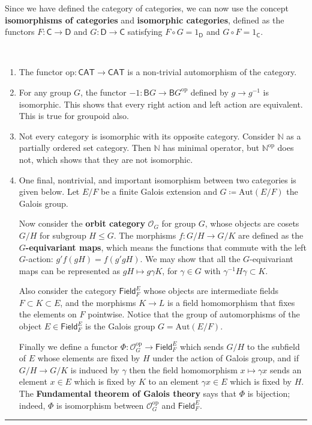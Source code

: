 Since we have defined the category of categories, we can now use the concept \textbf{isomorphisms of categories} and \textbf{isomorphic categories}, defined as the functors $F:\mathsf{C}\rightarrow \mathsf{D}$ and $G:\mathsf{D}\rightarrow \mathsf{C}$ satisfying $F\circ G=1_{\mathsf{D}}$ and $G\circ F=1_{\mathsf{C}}$.

\begin{exmp}
~\begin{enumerate}
\item The functor $\mathrm{op}:\mathsf{CAT}\rightarrow \mathsf{CAT}$ is a non-trivial automorphism of the category.
\item For any group $G$, the functor $-1:\mathsf{B}G\rightarrow \mathsf{B}G^{\mathrm{op}}$ defined by $g\rightarrow g^{-1}$ is isomorphic. This shows that every right action and left action are equivalent. This is true for groupoid also.
\item Not every category is isomorphic with its opposite category. Consider $\mathbb{N}$ as a partially ordered set category. Then $\mathbb{N}$ has minimal operator, but $\mathbb{N}^{\mathrm{op}}$ does not, which shows that they are not isomorphic.
\item One final, nontrivial, and important isomorphism between two categories is given below. Let $E/F$ be a finite Galois extension and $G\coloneqq \mathrm{Aut}(E/F)$ the Galois group. 

Now consider the \textbf{orbit category} $\mathcal{O}_G$ for group $G$, whose objects are cosets $G/H$ for subgroup $H\leq G$. The morphisms $f:G/H\rightarrow G/K$ are defined as the \textbf{$G$-equivariant maps}, which means the functions that commute with the left $G$-action: $g'f(gH)=f(g'gH)$. We may show that all the $G$-equivariant maps can be represented as $gH\mapsto g\gamma K$, for $\gamma \in G$ with $\gamma^{-1}H\gamma\subset K$.

Also consider the category $\mathsf{Field}_F^E$ whose objects are intermediate fields $F\subset K\subset E$, and the morphisms $K\rightarrow L$ is a field homomorphism that fixes the elements on $F$ pointwise. Notice that the group of automorphisms of the object $E\in \mathsf{Field}_F^E$ is the Galois group $G=\mathrm{Aut}(E/F)$.

Finally we define a functor $\Phi:\mathcal{O}_G^{\mathrm{op}}\rightarrow \mathsf{Field}_F^E$ which sends $G/H$ to the subfield of $E$ whose elements are fixed by $H$ under the action of Galois group, and if $G/H\rightarrow G/K$ is induced by $\gamma$ then the field homomorphism $x\mapsto \gamma x$ sends an element $x\in E$ which is fixed by $K$ to an element $\gamma x\in E$ which is fixed by $H$. The \textbf{Fundamental theorem of Galois theory} says that $\Phi$ is bijection; indeed, $\Phi$ is isomorphism between $\mathcal{O}_G^{\mathrm{op}}$ and $\mathsf{Field}_F^E$.
\end{enumerate}
\end{exmp}

\noindent\rule{\textwidth}{1pt}
\newline